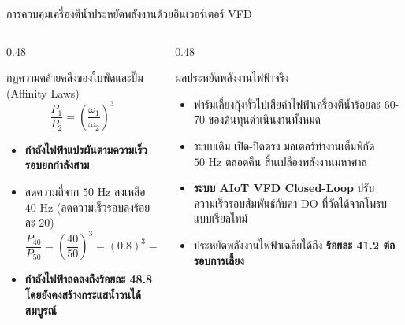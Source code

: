 \documentclass[aspectratio=169, 10pt]{beamer}
\begin{document}
\begin{frame}{การควบคุมเครื่องตีน้ำประหยัดพลังงานด้วยอินเวอร์เตอร์ VFD}
\begin{columns}[T]
    \begin{column}{0.48\textwidth}
        \begin{mastercard}{กฎความคล้ายคลึงของใบพัดและปั๊ม (Affinity Laws)}
            \begin{equation*}
                \frac{P_1}{P_2} = \left( \frac{\omega_1}{\omega_2} \right)^3
            \end{equation*}
            \begin{itemize}
                \item \textbf{กำลังไฟฟ้าแปรผันตามความเร็วรอบยกกำลังสาม}
                \item ลดความถี่จาก $50\text{ Hz}$ ลงเหลือ $40\text{ Hz}$ (ลดความเร็วรอบลงร้อยละ 20)
                \begin{equation*}
                    \frac{P_{40}}{P_{50}} = \left(\frac{40}{50}\right)^3 = (0.8)^3 = 0.512
                \end{equation*}
                \item \textbf{กำลังไฟฟ้าลดลงถึงร้อยละ 48.8 โดยยังคงสร้างกระแสน้ำวนได้สมบูรณ์}
            \end{itemize}
        \end{mastercard}
    \end{column}
    \begin{column}{0.48\textwidth}
        \begin{aquacard}{ผลประหยัดพลังงานไฟฟ้าจริง}
            \begin{itemize}
                \item ฟาร์มเลี้ยงกุ้งทั่วไปเสียค่าไฟฟ้าเครื่องตีน้ำร้อยละ 60-70 ของต้นทุนดำเนินงานทั้งหมด
                \item ระบบเดิม เปิด-ปิดตรง มอเตอร์ทำงานเต็มพิกัด $50\text{ Hz}$ ตลอดคืน สิ้นเปลืองพลังงานมหาศาล
                \item \textbf{ระบบ AIoT VFD Closed-Loop} ปรับความเร็วรอบสัมพันธ์กับค่า DO ที่วัดได้จากโพรบแบบเรียลไทม์
                \item ประหยัดพลังงานไฟฟ้าเฉลี่ยได้ถึง \textbf{ร้อยละ 41.2 ต่อรอบการเลี้ยง}
            \end{itemize}
        \end{aquacard}
    \end{column}
\end{columns}
\end{frame}
\end{document}
